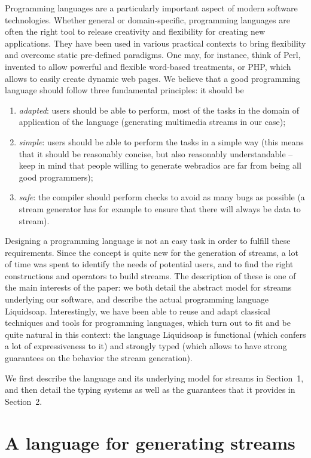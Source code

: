 \documentclass{llncs}
\begin{document}
Programming languages are a particularly important aspect of modern software
technologies.  Whether general or domain-specific, programming languages are
often the right tool to release creativity and flexibility for creating new
applications. They have been used in various practical contexts to bring
flexibility and overcome static pre-defined paradigms. One may, for instance,
think of Perl, invented to allow powerful and flexible word-based treatments, or
PHP, which allows to easily create dynamic web pages. We believe that a good
programming language should follow three fundamental principles: it should be
\begin{enumerate}
\item \emph{adapted}: users should be able to perform, most of the tasks in the
  domain of application of the language (generating multimedia streams in our
  case);
\item \emph{simple}: users should be able to perform the tasks in a simple way
  (this means that it should be reasonably concise, but also reasonably
  understandable -- keep in mind that people willing to generate webradios are
  far from being all good programmers);
\item \emph{safe}: the compiler should perform checks to avoid as many bugs as
  possible (a stream generator has for example to ensure that there will always
  be data to stream).
\end{enumerate}
Designing a programming language is not an easy task in order to fulfill these
requirements. Since the concept is quite new for the generation of streams, a
lot of time was spent to identify the needs of potential users, and to find the
right constructions and operators to build streams. The description of these is
one of the main interests of the paper: we both detail the abstract model for
streams underlying our software, and describe the actual programming language
Liquidsoap. Interestingly, we have been able to reuse and adapt classical
techniques and tools for programming languages, which turn out to fit and be
quite natural in this context: the language Liquidsoap is functional (which
confers a lot of expressiveness to it) and strongly typed (which allows to have
strong guarantees on the behavior the stream generation).

We first describe the language and its underlying model for streams in
Section~1, and then detail the typing systems as well as the guarantees that it
provides in Section~2.

\section{A language for generating streams}
\end{document}
